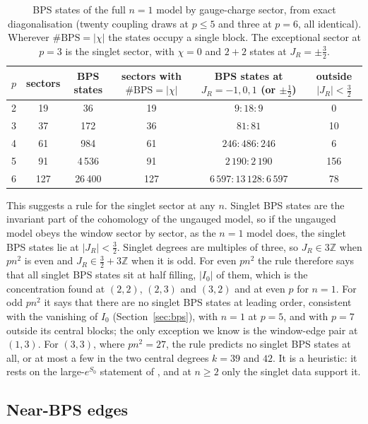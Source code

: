 \documentclass[10pt]{article}
\begin{document}
\begin{table}[t]\centering\small
\begin{tabular}{cccccc}
\toprule
$p$ & sectors & BPS states & sectors with $\#\mathrm{BPS}=|\chi|$ & BPS states at $J_R=-1,0,1$ (or $\pm\frac12$) &
outside $|J_R|<\frac32$\\
\midrule
2 & 19 & 36 & 19 & $9:18:9$ & 0\\
3 & 37 & 172 & 36 & $81:81$ & 10\\
4 & 61 & 984 & 61 & $246:486:246$ & 6\\
5 & 91 & 4\,536 & 91 & $2\,190:2\,190$ & 156\\
6 & 127 & 26\,400 & 127 & $6\,597:13\,128:6\,597$ & 78\\
\bottomrule
\end{tabular}
\caption{BPS states of the full $n=1$ model by gauge-charge sector, from exact diagonalisation (twenty coupling
draws at $p\le5$ and three at $p=6$, all identical). Wherever $\#\mathrm{BPS}=|\chi|$ the states occupy a single
block. The exceptional sector at $p=3$ is the singlet sector, with $\chi=0$ and $2+2$ states at $J_R=\pm\frac32$.}
\label{tab:sectors}
\end{table}

This suggests a rule for the singlet sector at any $n$. Singlet BPS states are the invariant part of the cohomology of
the ungauged model, so if the ungauged model obeys the window sector by sector, as the $n=1$ model does, the singlet
BPS states lie at $|J_R|<\frac32$. Singlet degrees are multiples of three, so $J_R\in3\mathbb Z$ when $pn^2$ is even
and $J_R\in\frac32+3\mathbb Z$ when it is odd. For even $pn^2$ the rule therefore says that all singlet BPS states sit
at half filling, $|I_0|$ of them, which is the concentration found at $(2,2)$, $(2,3)$ and $(3,2)$ and at even $p$ for
$n=1$. For odd $pn^2$ it says that there are no singlet BPS states at leading order, consistent with the vanishing of
$I_0$ (Section~\ref{sec:bps}), with $n=1$ at $p=5$, and with $p=7$ outside its central blocks; the only exception we
know is the window-edge pair at $(1,3)$. For $(3,3)$, where $pn^2=27$, the rule predicts no singlet BPS states at all,
or at most a few in the two central degrees $k=39$ and $42$. It is a heuristic: it rests on the large-$e^{S_0}$
statement of \cite{TW}, and at $n\ge2$ only the singlet data support it.

\subsection{Near-BPS edges}
\end{document}
